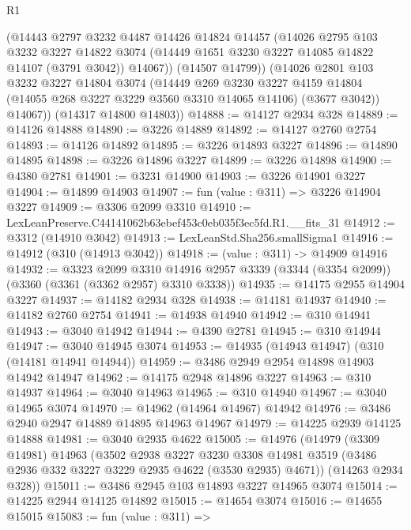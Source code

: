 \begin{lexlean}{R1}
\begin{coremodule}
          (@14443
            @2797
            @3232
            @4487
            @14426
            @14824
            @14457
            (@14026
              @2795
              @103
              @3232
              @3227
              @14822
              @3074
              (@14449 @1651 @3230 @3227 @14085 @14822 @14107 (@3791 @3042))
              @14067))
          (@14507 @14799))
        (@14026
          @2801
          @103
          @3232
          @3227
          @14804
          @3074
          (@14449
            @269
            @3230
            @3227
            @4159
            @14804
            (@14055 @268 @3227 @3229 @3560 @3310 @14065 @14106)
            (@3677 @3042))
          @14067))
      (@14317 @14800 @14803))
@14888 := @14127 @2934 @328
@14889 := @14126 @14888
@14890 := @3226 @14889
@14892 := @14127 @2760 @2754
@14893 := @14126 @14892
@14895 := @3226 @14893 @3227
@14896 := @14890 @14895
@14898 := @3226 @14896 @3227
@14899 := @3226 @14898
@14900 := @4380 @2781
@14901 := @3231 @14900
@14903 := @3226 @14901 @3227
@14904 := @14899 @14903
@14907 := fun (value : @311) => @3226 @14904 @3227
@14909 := @3306 @2099 @3310
@14910 := LexLeanPreserve.C44141062b63ebef453c0eb035f3ec5fd.R1.__fits_31
@14912 := @3312 (@14910 @3042)
@14913 := LexLeanStd.Sha256.smallSigma1
@14916 := @14912 (@310 (@14913 @3042))
@14918 := (value : @311) -> @14909 @14916
@14932 := @3323
    @2099
    @3310
    @14916
    @2957
    @3339
    (@3344 (@3354 @2099))
    (@3360 (@3361 (@3362 @2957) @3310 @3338))
@14935 := @14175 @2955 @14904 @3227
@14937 := @14182 @2934 @328
@14938 := @14181 @14937
@14940 := @14182 @2760 @2754
@14941 := @14938 @14940
@14942 := @310 @14941
@14943 := @3040 @14942
@14944 := @4390 @2781
@14945 := @310 @14944
@14947 := @3040 @14945 @3074
@14953 := @14935 (@14943 @14947) (@310 (@14181 @14941 @14944))
@14959 := @3486 @2949 @2954 @14898 @14903 @14942 @14947
@14962 := @14175 @2948 @14896 @3227
@14963 := @310 @14937
@14964 := @3040 @14963
@14965 := @310 @14940
@14967 := @3040 @14965 @3074
@14970 := @14962 (@14964 @14967) @14942
@14976 := @3486 @2940 @2947 @14889 @14895 @14963 @14967
@14979 := @14225 @2939 @14125 @14888
@14981 := @3040 @2935 @4622
@15005 := @14976
    (@14979
      (@3309 @14981)
      @14963
      (@3502
        @2938
        @3227
        @3230
        @3308
        @14981
        @3519
        (@3486 @2936 @332 @3227 @3229 @2935 @4622 (@3530 @2935) @4671))
      (@14263 @2934 @328))
@15011 := @3486 @2945 @103 @14893 @3227 @14965 @3074
@15014 := @14225 @2944 @14125 @14892
@15015 := @14654 @3074
@15016 := @14655 @15015
@15083 := fun (value : @311) =>

\end{coremodule}
\end{lexlean}
